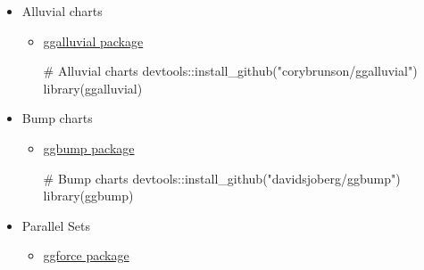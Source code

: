 \documentclass[
  letterpaper,
  DIV=11,
  numbers=noendperiod,
  oneside]{scrreprt}
\newenvironment{Shaded}{\begin{snugshade}}{\end{snugshade}}
\newcommand{\CommentTok}[1]{\textcolor[rgb]{0.37,0.37,0.37}{#1}}
\newcommand{\FunctionTok}[1]{\textcolor[rgb]{0.28,0.35,0.67}{#1}}
\newcommand{\NormalTok}[1]{\textcolor[rgb]{0.00,0.23,0.31}{#1}}
\newcommand{\SpecialCharTok}[1]{\textcolor[rgb]{0.37,0.37,0.37}{#1}}
\newcommand{\StringTok}[1]{\textcolor[rgb]{0.13,0.47,0.30}{#1}}
\begin{document}
\begin{itemize}
\begin{itemize}
\begin{Shaded}
\begin{Highlighting}[]
\CommentTok{\# Rain{-}cloud plots }
\NormalTok{remotes}\SpecialCharTok{::}\FunctionTok{install\_github}\NormalTok{(}\StringTok{\textquotesingle{}jorvlan/raincloudplots\textquotesingle{}}\NormalTok{)}
\NormalTok{remotes}\SpecialCharTok{::}\FunctionTok{install\_github}\NormalTok{(}\StringTok{\textquotesingle{}mjskay/ggdist\textquotesingle{}}\NormalTok{)}
\FunctionTok{library}\NormalTok{(raincloudplots)}
\FunctionTok{library}\NormalTok{(ggdist)}
\end{Highlighting}
\end{Shaded}
  \end{itemize}
\item[$\boxtimes$]
  Alluvial charts

  \begin{itemize}
  \item
    \href{https://corybrunson.github.io/ggalluvial/}{ggalluvial package}

\begin{Shaded}
\begin{Highlighting}[]
\CommentTok{\# Alluvial charts}
\NormalTok{devtools}\SpecialCharTok{::}\FunctionTok{install\_github}\NormalTok{(}\StringTok{"corybrunson/ggalluvial"}\NormalTok{)}
\FunctionTok{library}\NormalTok{(ggalluvial)}
\end{Highlighting}
\end{Shaded}
  \end{itemize}
\item[$\boxtimes$]
  Bump charts

  \begin{itemize}
  \item
    \href{https://github.com/davidsjoberg/ggbump}{ggbump package}

\begin{Shaded}
\begin{Highlighting}[]
\CommentTok{\# Bump charts}
\NormalTok{devtools}\SpecialCharTok{::}\FunctionTok{install\_github}\NormalTok{(}\StringTok{"davidsjoberg/ggbump"}\NormalTok{)}
\FunctionTok{library}\NormalTok{(ggbump)}
\end{Highlighting}
\end{Shaded}
  \end{itemize}
\item[$\boxtimes$]
  Parallel Sets

  \begin{itemize}
  \item
    \href{https://ggforce.data-imaginist.com/index.html}{ggforce
    package}


\end{itemize}
\end{itemize}
\end{document}
